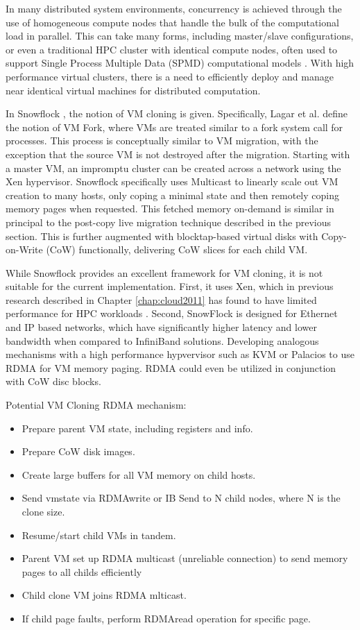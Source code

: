 In many distributed system environments, concurrency is achieved through the use of homogeneous compute nodes that handle the bulk of the computational load in parallel. This can take many forms, including master/slave configurations, or even a traditional HPC cluster with identical compute nodes, often used to support Single Process Multiple Data (SPMD) computational models \cite{spmd1988}. With high performance virtual clusters, there is a need to efficiently deploy and manage near identical virtual machines for distributed computation. 

In Snowflock \cite{lagar2009snowflock, lagar2011snowflock}, the notion of VM cloning is given. Specifically, Lagar et al. define the notion of VM Fork, where VMs are treated similar to a fork\(\) system call for processes.   This process is conceptually similar to VM migration, with the exception that the source VM is not destroyed after the migration. Starting with a master VM, an impromptu cluster can be created across a network using the Xen hypervisor.  Snowflock specifically uses Multicast to linearly scale out VM creation to many hosts, only coping a minimal state and then remotely coping memory pages when requested.  This fetched memory on-demand is similar in principal to the post-copy live migration technique described in the previous section.  This is further augmented with blocktap-based virtual disks with Copy-on-Write (CoW) functionally, delivering CoW slices for each child VM. 

While Snowflock provides an excellent framework for VM cloning, it is not suitable for the current implementation. First, it uses Xen, which in previous research described in Chapter \ref{chap:cloud2011} has found to have limited performance for HPC workloads \cite{Younge2011cloud}.  Second, SnowFlock is designed for Ethernet and IP based networks, which have significantly higher latency and lower bandwidth when compared to InfiniBand solutions.  Developing analogous mechanisms with a high performance hypvervisor such as KVM or Palacios \cite{lange2010palacios} to use RDMA for VM memory paging. RDMA could even be utilized in conjunction with CoW disc blocks.

Potential VM Cloning RDMA mechanism:
\begin{itemize}
\item Prepare parent VM state, including registers and info.
\item Prepare CoW disk images.
\item Create large buffers for all VM memory on child hosts. 
\item Send vmstate via RDMAwrite or IB Send to N child nodes, where N is the clone size.
\item Resume/start child VMs in tandem. 
\item Parent VM set up RDMA multicast (unreliable connection) to send memory pages to all childs efficiently
\item Child clone VM joins RDMA mlticast.
\item If child page faults, perform RDMAread operation for specific page. 
\end{itemize}

